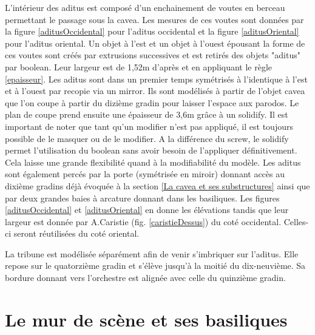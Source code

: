 L'intérieur des aditus est composé d'un enchainement de voutes en berceau permettant le passage sous la cavea. Les mesures de ces voutes sont données par la figure \ref{aditusOccidental} pour l'aditus occidental et la figure \ref{aditusOriental} pour l'aditus oriental. Un objet à l'est et un objet à l'ouest épousant la forme de ces voutes sont créés par extrusions successives et est retirés des objets "aditus" par \gls{boolean}. Leur largeur est de 1,52m d'après \cite[Pl. XXI]{orangePl} et en appliquant le règle \ref{epaisseur}. Les aditus sont dans un premier temps symétrisés à l'identique à l'est et à l'ouest par recopie via un \gls{mirror}. Ils sont modélisés à partir de l'objet cavea que l'on coupe à partir du dizième gradin pour laisser l'espace aux \gls{parodos}. Le plan de coupe prend ensuite une épaisseur de 3,6m grâce à un \gls{solidify}. Il est important de noter que tant qu'un modifier n'est pas appliqué, il est toujours possible de le masquer ou de le modifier. A la différence du \gls{screw}, le \gls{solidify} permet l'utilisation du \gls{boolean} sans avoir besoin de l'appliquer définitivement. Cela laisse une grande flexibilité quand à la modifiabilité du modèle. Les aditus sont également percés par la porte (symétrisée en miroir) donnant accès au dixième gradins déjà évoquée à la section \ref{La cavea et ses substructures} ainsi que par deux grandes baies à arcature donnant dans les basiliques. Les figures \ref{aditusOccidental} et \ref{aditusOriental} en donne les élévations tandis que leur largeur est donnée par A.Caristie (fig. \ref{caristieDessus}) du coté occidental. Celles-ci seront réutilisées du coté oriental.

La tribune est modélisée séparément afin de venir s'imbriquer sur l'aditus. Elle repose sur le quatorzième gradin et s'élève jusqu'à la moitié du dix-neuvième. Sa bordure donnant vers l'orchestre est alignée avec celle du quinzième gradin.

		\section{Le mur de scène et ses basiliques} 
		\label{mur}

